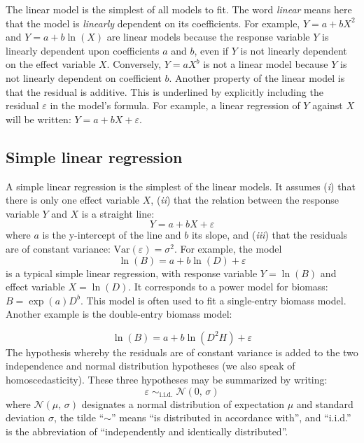The linear model is the simplest of all models to fit. The word \emph{linear} means here that the model is \emph{linearly} dependent on its coefficients. For example, $Y=a+bX^2$ and $Y=a+b\ln(X)$ are linear models because the response variable $Y$ is linearly dependent upon coefficients $a$ and $b$, even if $Y$ is not linearly dependent on the effect variable $X $. Conversely, $Y=aX^b$ is not a linear model because $Y$ is not linearly dependent on coefficient $b$. Another property of the linear model is that the residual is additive. This is underlined by explicitly including the residual $\varepsilon$ in the model's formula. For example, a linear regression of $Y$ against $X$ will be written: $Y=a+bX+\varepsilon$.

\subsection{Simple linear regression}

A simple linear regression is the simplest of the linear models. It assumes (\emph{i}) that there is only one effect variable $X$, (\emph{ii}) that the relation between the response variable $Y$ and $X$ is a straight line:
\[
Y=a+bX+\varepsilon
\]
where $a$ is the y-intercept of the line and $b$ its slope, and 
(\emph{iii}) that the residuals are of constant variance:
$\mathrm{Var}(\varepsilon)=\sigma^2$. For example, the model
\begin{equation}
\ln(B)=a+b\ln(D)+\varepsilon\label{pow}
\end{equation}
is a typical simple linear regression, with response variable $Y=\ln(B)$ and effect variable $X=\ln(D)$. It corresponds to a power model for biomass: $B=\exp(a)D^b$. This model is often used to fit a single-entry biomass model. Another example is the double-entry biomass model:

\begin{equation}
\ln(B)=a+b\ln(D^2H)+\varepsilon\label{powH}
\end{equation}
The hypothesis whereby the residuals are of constant variance is added to the two independence and normal distribution hypotheses (we also speak of homoscedasticity). These three hypotheses may be summarized by writing:
\[
\varepsilon\;\mathop{\sim}_{\mathrm{i.i.d.}}\;\mathcal{N}(0,\,\sigma)
\]
where $\mathcal{N}(\mu,\,\sigma)$ designates a normal distribution of expectation
$\mu$ and standard deviation $\sigma$, the tilde ``$\sim$'' means
``is distributed in accordance with'', and ``i.i.d.'' is the abbreviation of ``independently and identically distributed''.

